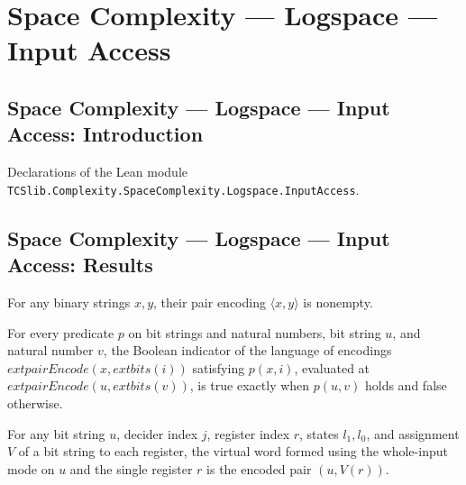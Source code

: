 \section{Space Complexity --- Logspace --- Input Access}
\subsection*{Space Complexity --- Logspace --- Input Access: Introduction}

Declarations of the Lean module \texttt{TCSlib.Complexity.SpaceComplexity.Logspace.InputAccess}.

\subsection*{Space Complexity --- Logspace --- Input Access: Results}

\begin{theorem}
\label{Complexity.pairEncode_ne_nil}
\leanok
{}
For any binary strings $x,y$, their pair encoding $\langle x,y\rangle$ is nonempty.
\end{theorem}

\begin{theorem}
\label{Complexity.indicator_indexLang_pairEncode}
\leanok
{}
For every predicate $p$ on bit strings and natural numbers, bit string $u$, and natural
number $v$, the Boolean indicator of the language of encodings
$	ext{pairEncode}(x,	ext{bits}(i))$ satisfying $p(x,i)$, evaluated at
$	ext{pairEncode}(u,	ext{bits}(v))$, is true exactly when $p(u,v)$ holds and false
otherwise.
\end{theorem}

\begin{theorem}
\leanok
{}
For any bit string $u$, decider index $j$, register index $r$, states $l_1,l_0$, and
assignment $V$ of a bit string to each register, the virtual word formed using the
whole-input mode on $u$ and the single register $r$ is the encoded pair $(u,V(r))$.
\end{theorem}

